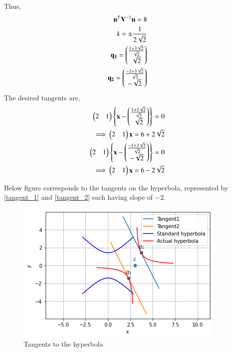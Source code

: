 \documentclass[journal,12pt,twocolumn]{IEEEtran}
\begin{document}
Thus, 
\begin{align}
    \mathbf{n}^T\mathbf{V}^{-1}\mathbf{n}=8 \\
    k= \pm \frac{1}{2\sqrt{2}} \\
    \mathbf{q_1} = \begin{pmatrix}\frac{1+3\sqrt{2}}{\sqrt{2}} \\ \sqrt{2}\end{pmatrix} \\
    \mathbf{q_2} = \begin{pmatrix}\frac{-1+3\sqrt{2}}{\sqrt{2}} \\ -\sqrt{2}\end{pmatrix}
\end{align}
The desired tangents are, 
\begin{align}
    \begin{pmatrix}2&1\end{pmatrix} \left\{\mathbf{x}-\begin{pmatrix}\frac{1+3\sqrt{2}}{\sqrt{2}} \\ \sqrt{2}\end{pmatrix}\right\} = 0 \\ 
    \implies \begin{pmatrix}2&1\end{pmatrix}\mathbf{x} = 6+2\sqrt{2} \label{tangent_1} \\
    \begin{pmatrix}2&1\end{pmatrix} \left\{\mathbf{x}-\begin{pmatrix}\frac{-1+3\sqrt{2}}{\sqrt{2}} \\ -\sqrt{2}\end{pmatrix}\right\} = 0 \\
    \implies \begin{pmatrix}2&1\end{pmatrix}\mathbf{x} = 6-2\sqrt{2}  \label{tangent_2}
\end{align}

Below figure corresponds to the tangents on the hyperbola,  represented by \eqref{tangent_1} and \eqref{tangent_2} each having slope of $-2$. 
\renewcommand{\thefigure}{\arabic{figure}}
\begin{figure}[h!]
	\centering
	\includegraphics[width=\columnwidth]{assignment_6.png}
	\caption{Tangents to the hyperbola}
	\label{fig_1}
\end{figure}
\end{document}
